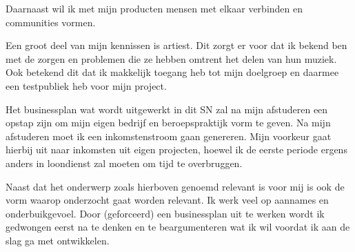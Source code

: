 Daarnaast wil ik met mijn producten mensen met elkaar verbinden en communities vormen. 

Een groot deel van mijn kennissen is artiest. Dit zorgt er voor dat ik bekend ben met de zorgen en problemen die ze hebben omtrent het delen van hun muziek. Ook betekend dit dat ik makkelijk toegang heb tot mijn doelgroep en daarmee een testpubliek heb voor mijn project.

Het businessplan wat wordt uitgewerkt in dit SN zal na mijn afstuderen een opstap zijn om mijn eigen bedrijf en beroepspraktijk vorm te geven. Na mijn afstuderen moet ik een inkomstenstroom gaan genereren. Mijn voorkeur gaat hierbij uit naar inkomsten uit eigen projecten, hoewel ik de eerste periode ergens anders in loondienst zal moeten om tijd te overbruggen.

Naast dat het onderwerp zoals hierboven genoemd relevant is voor mij is ook de vorm waarop onderzocht gaat worden relevant. Ik werk veel op aannames en onderbuikgevoel. Door (geforceerd) een businessplan uit te werken wordt ik gedwongen eerst na te denken en te beargumenteren wat ik wil voordat ik aan de slag ga met ontwikkelen.
